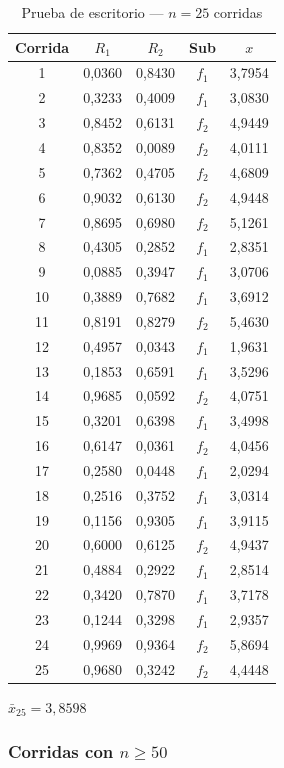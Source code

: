 \documentclass[12pt, a4paper]{article}
\newenvironment{mitabla}[2][H]{%
  \begin{table}[#1]
  \centering
  \caption{#2}
  \small
}{%
  \end{table}
}
\begin{document}
\begin{mitabla}[H]{\texorpdfstring{Prueba de escritorio — $n=25$ corridas}{Prueba de escritorio - n=25 corridas}}
\small
\begin{tabular}{ccccc}
\toprule
Corrida & $R_1$ & $R_2$ & Sub & $x$ \\
\midrule
1  & 0,0360 & 0,8430 & $f_1$ & 3,7954 \\
2  & 0,3233 & 0,4009 & $f_1$ & 3,0830 \\
3  & 0,8452 & 0,6131 & $f_2$ & 4,9449 \\
4  & 0,8352 & 0,0089 & $f_2$ & 4,0111 \\
5  & 0,7362 & 0,4705 & $f_2$ & 4,6809 \\
6  & 0,9032 & 0,6130 & $f_2$ & 4,9448 \\
7  & 0,8695 & 0,6980 & $f_2$ & 5,1261 \\
8  & 0,4305 & 0,2852 & $f_1$ & 2,8351 \\
9  & 0,0885 & 0,3947 & $f_1$ & 3,0706 \\
10 & 0,3889 & 0,7682 & $f_1$ & 3,6912 \\
11 & 0,8191 & 0,8279 & $f_2$ & 5,4630 \\
12 & 0,4957 & 0,0343 & $f_1$ & 1,9631 \\
13 & 0,1853 & 0,6591 & $f_1$ & 3,5296 \\
14 & 0,9685 & 0,0592 & $f_2$ & 4,0751 \\
15 & 0,3201 & 0,6398 & $f_1$ & 3,4998 \\
16 & 0,6147 & 0,0361 & $f_2$ & 4,0456 \\
17 & 0,2580 & 0,0448 & $f_1$ & 2,0294 \\
18 & 0,2516 & 0,3752 & $f_1$ & 3,0314 \\
19 & 0,1156 & 0,9305 & $f_1$ & 3,9115 \\
20 & 0,6000 & 0,6125 & $f_2$ & 4,9437 \\
21 & 0,4884 & 0,2922 & $f_1$ & 2,8514 \\
22 & 0,3420 & 0,7870 & $f_1$ & 3,7178 \\
23 & 0,1244 & 0,3298 & $f_1$ & 2,9357 \\
24 & 0,9969 & 0,9364 & $f_2$ & 5,8694 \\
25 & 0,9680 & 0,3242 & $f_2$ & 4,4448 \\
\bottomrule
\end{tabular}
\end{mitabla}

$\bar{x}_{25} = 3{,}8598$

\subsubsection{\texorpdfstring{Corridas con $n \geq 50$}{Corridas con n mayor igual 50}}
\end{document}
